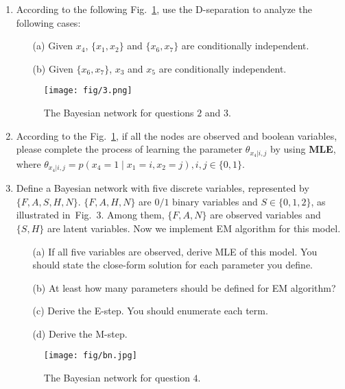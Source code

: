 \documentclass[10pt]{article}
\begin{document}
\begin{enumerate}[1.]
		\item According to the following Fig.~\ref{fig2}, use the D-separation to analyze the following cases:
		\begin{itemize}
			\item[(a)] Given $x_4$, $ \{x_1, x_2\} $ and $ \{x_6, x_7\} $ are conditionally independent.~
			\item[(b)] Given $\{x_6, x_7\}$, $ x_3 $ and $ x_5 $ are conditionally independent.~
		\end{itemize}
		\begin{figure}[h!] 
			\centering
			\texttt{[image: fig/3.png]}
			\label{fig2}
			\caption{The Bayesian network for questions $2$ and $3$.}
		\end{figure}
	
		\item According to the Fig.~\ref{fig2}, if all the nodes are observed and boolean variables, please complete the process of learning the parameter $ \theta_{x_4|i,j} $ by using \textbf{MLE}, where $ \theta_{x_4|i,j} = p(x_4 = 1\mid x_1 = i, x_2 = j), i,j \in \{ 0, 1\}$.~
	
		\item Define a Bayesian network with five discrete variables, represented by $\{F,A,S,H,N\}$. $\{F,A,H,N\}$ are $0/1$ binary variables and $S\in \{0,1,2\}$, as illustrated in~Fig.~3. Among them, $\{F,A,N\}$ are observed variables and $\{S,H\}$ are latent variables. Now we implement EM algorithm for this model.
			\begin{itemize}
				\item[(a)] If all five variables are observed, derive MLE of this model. You should state the close-form solution for each parameter you define.~
				
				\item[(b)] At least how many parameters should be defined for EM algorithm?~
				
				\item[(c)] Derive the E-step. You should enumerate each term.~
				
				\item[(d)] Derive the M-step.~
 			\end{itemize}
 				\begin{figure}[h!]
		 			\centering
		 			\texttt{[image: fig/bn.jpg]}
		 			\label{fig3}
		 			\caption{The Bayesian network for question $4$.}
 				\end{figure}
		

\end{enumerate}
\end{document}
